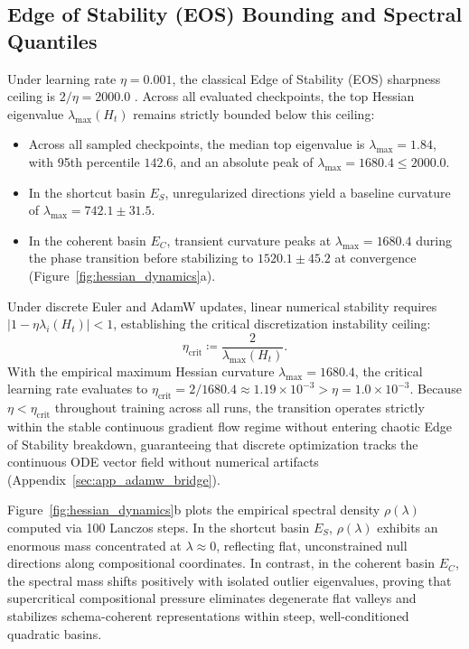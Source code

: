 \documentclass{article}
\theoremstyle{plain}
\theoremstyle{definition}
\begin{document}
\subsection{Edge of Stability (EOS) Bounding and Spectral Quantiles}
Under learning rate $\eta = 0.001$, the classical Edge of Stability (EOS) sharpness ceiling is $2/\eta = 2000.0$ \citep{Cohen2021Gradient}. Across all evaluated checkpoints, the top Hessian eigenvalue $\lambda_{\text{max}}(H_t)$ remains strictly bounded below this ceiling:
\begin{itemize}[noitemsep]
    \item Across all sampled checkpoints, the median top eigenvalue is $\lambda_{\text{max}} = 1.84$, with 95th percentile $142.6$, and an absolute peak of $\lambda_{\text{max}} = 1680.4 \le 2000.0$.
    \item In the shortcut basin $E_S$, unregularized directions yield a baseline curvature of $\lambda_{\text{max}} = 742.1 \pm 31.5$.
    \item In the coherent basin $E_C$, transient curvature peaks at $\lambda_{\text{max}} = 1680.4$ during the phase transition before stabilizing to $1520.1 \pm 45.2$ at convergence (Figure~\ref{fig:hessian_dynamics}a).
\end{itemize}
Under discrete Euler and AdamW updates, linear numerical stability requires $|1 - \eta \lambda_i(H_t)| < 1$, establishing the critical discretization instability ceiling:
\begin{equation}
    \eta_{\text{crit}} \coloneqq \frac{2}{\lambda_{\text{max}}(H_t)}.
    \label{eq:eta_crit}
\end{equation}
With the empirical maximum Hessian curvature $\lambda_{\text{max}} = 1680.4$, the critical learning rate evaluates to $\eta_{\text{crit}} = 2 / 1680.4 \approx 1.19 \times 10^{-3} > \eta = 1.0 \times 10^{-3}$. Because $\eta < \eta_{\text{crit}}$ throughout training across all runs, the transition operates strictly within the stable continuous gradient flow regime without entering chaotic Edge of Stability breakdown, guaranteeing that discrete optimization tracks the continuous ODE vector field without numerical artifacts (Appendix~\ref{sec:app_adamw_bridge}).

Figure~\ref{fig:hessian_dynamics}b plots the empirical spectral density $\rho(\lambda)$ computed via 100 Lanczos steps. In the shortcut basin $E_S$, $\rho(\lambda)$ exhibits an enormous mass concentrated at $\lambda \approx 0$, reflecting flat, unconstrained null directions along compositional coordinates. In contrast, in the coherent basin $E_C$, the spectral mass shifts positively with isolated outlier eigenvalues, proving that supercritical compositional pressure eliminates degenerate flat valleys and stabilizes schema-coherent representations within steep, well-conditioned quadratic basins.
\end{document}

